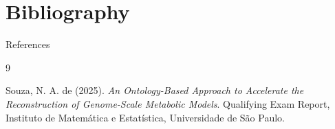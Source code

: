 \section{Bibliography} %

\begin{frame}[allowframebreaks]{References}
	\small
	    \small
	\begin{thebibliography}{9}
		
		Souza, N. A. de (2025).
		\textit{An Ontology-Based Approach to Accelerate the Reconstruction of Genome-Scale Metabolic Models}.
		Qualifying Exam Report, Instituto de Matemática e Estatística, Universidade de São Paulo.
		
	\end{thebibliography}
		
\end{frame}
